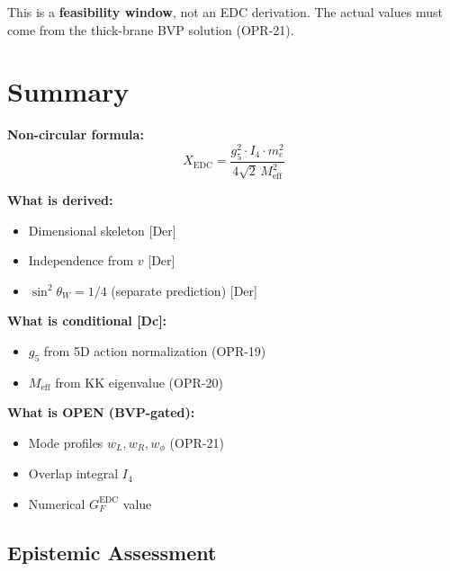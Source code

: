 \documentclass[11pt]{article}
\newcommand{\tagDer}{{\small\textsf{[Der]}}}
\begin{document}
\begin{tcolorbox}[colback=yellow!10!white, colframe=yellow!75!black, title=Toy Model Caveat]
This is a \textbf{feasibility window}, not an EDC derivation.
The actual values must come from the thick-brane BVP solution (OPR-21).
\end{tcolorbox}

\section{Summary}

\begin{tcolorbox}[colback=green!5!white, colframe=green!75!black, title=P3-3 Framework Summary]
\textbf{Non-circular formula:}
\begin{equation}
    \boxed{X_{\text{EDC}} = \frac{g_5^2 \cdot I_4 \cdot m_e^2}{4\sqrt{2} \, M_{\text{eff}}^2}}
\end{equation}

\textbf{What is derived:}
\begin{itemize}
    \item Dimensional skeleton \tagDer{}
    \item Independence from $v$ \tagDer{}
    \item $\sin^2\theta_W = 1/4$ (separate prediction) \tagDer{}
\end{itemize}

\textbf{What is conditional [Dc]:}
\begin{itemize}
    \item $g_5$ from 5D action normalization (OPR-19)
    \item $M_{\text{eff}}$ from KK eigenvalue (OPR-20)
\end{itemize}

\textbf{What is OPEN (BVP-gated):}
\begin{itemize}
    \item Mode profiles $w_L, w_R, w_\phi$ (OPR-21)
    \item Overlap integral $I_4$
    \item Numerical $G_F^{\text{EDC}}$ value
\end{itemize}
\end{tcolorbox}

\subsection{Epistemic Assessment}
\end{document}
